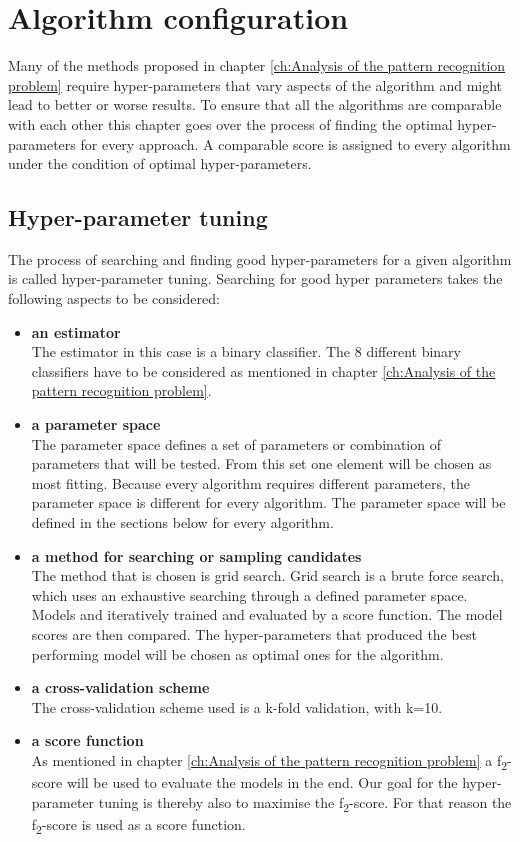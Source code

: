 \chapter{Algorithm configuration}
\label{ch:Algorithm configuration}
Many of the methods proposed in chapter \ref{ch:Analysis of the pattern recognition problem} require hyper-parameters that vary aspects of the algorithm and might lead to better or worse results. To ensure that all the algorithms are comparable with each other this chapter goes over the process of finding the optimal hyper-parameters for every approach. A comparable score is assigned to every algorithm under the condition of optimal hyper-parameters.
\section*{Hyper-parameter tuning}
The process of searching and finding good hyper-parameters for a given algorithm is called hyper-parameter tuning. Searching for good hyper parameters takes the following aspects to be considered:
\begin{itemize}
\item{ \textbf{an estimator}} \\
The estimator in this case is a binary classifier. The 8 different binary classifiers have to be considered as mentioned in chapter \ref{ch:Analysis of the pattern recognition problem}.
\item{\textbf{a parameter space}} \\
The parameter space defines a set of parameters or combination of parameters that will be tested. From this set one element will be chosen as most fitting. Because every algorithm requires different parameters, the parameter space is different for every algorithm. The parameter space will be defined in the sections below for every algorithm. 
\item{\textbf{a method for searching or sampling candidates}}\\
The method that is chosen is grid search. Grid search is a brute force search, which uses an exhaustive searching through a defined parameter space. Models and iteratively trained and evaluated by a score function. The model scores are then compared. The hyper-parameters that produced the best performing model will be chosen as optimal ones for the algorithm.
\item{\textbf{a cross-validation scheme}} \\
The cross-validation scheme used is a k-fold validation, with k=10.
\item{\textbf{a score function}}\\
As mentioned in chapter \ref{ch:Analysis of the pattern recognition problem}  a  f\textsubscript{2}-score will be used to evaluate the models in the end. Our goal for the hyper-parameter tuning is thereby also to maximise the  f\textsubscript{2}-score. For that reason the  f\textsubscript{2}-score is used as a score function.
\end{itemize}

